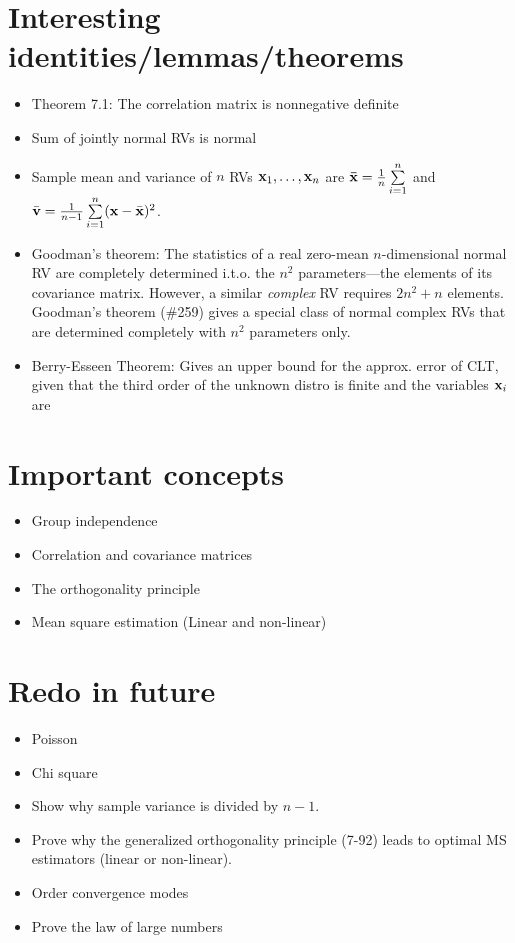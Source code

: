 \documentclass[a4paper, oneside]{book}
\begin{document}
\section{Interesting identities/lemmas/theorems}

\begin{itemize}

\item Theorem 7.1: The correlation matrix is nonnegative definite
\item Sum of jointly normal RVs is normal
\item Sample mean and variance of $n$ RVs $\mathbf{x}_1, \hdots, \mathbf{x}_n$ are $\mathbf{\bar{x}} = \frac{1}{n}\sum\limits_{i=1}^n$ and $\bar{\mathbf{v}} = \frac{1}{n-1}\sum\limits_{i=1}^n(\mathbf{x}-\bar{\mathbf{x}})^2$.
\item Goodman's theorem: The statistics of a real zero-mean $n$-dimensional normal RV are completely determined i.t.o. the $n^2$ parameters\----the elements of its covariance matrix. However, a similar \textit{complex} RV requires $2n^2+n$ elements. Goodman's theorem (\#259) gives a special class of normal complex RVs that are determined completely with $n^2$ parameters only.
\item Berry-Esseen Theorem: Gives an upper bound for the approx. error of CLT, given that the third order of the unknown distro is finite and the variables $\mathbf{x}_i$ are \iid
\end{itemize}

\section{Important concepts}

\begin{itemize}
\item Group independence
\item Correlation and covariance matrices
\item The orthogonality principle
\item Mean square estimation (Linear and non-linear)
\end{itemize}

\section{Redo in future}
\begin{itemize}
\item Poisson
\item Chi square 
\item Show why sample variance is divided by $n-1$.
\item Prove why the generalized orthogonality principle (7-92) leads to optimal MS estimators (linear or non-linear).
\item Order convergence modes
\item Prove the law of large numbers
\end{itemize}
\end{document}
